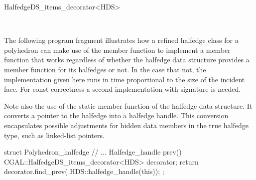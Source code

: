 \begin{ccRefClass}{HalfedgeDS_items_decorator<HDS>}
\ccSeeAlso

\\

\ccExample

The following program fragment illustrates how a refined halfedge
class for a polyhedron can make use of the  member
function to implement a  member function that works
regardless of whether the halfedge data structure  provides a
 member function for its halfedges or not. In the case that not,
the implementation given here runs in time proportional to the size of the 
incident face. For const-correctness a second implementation with signature
 is needed.

Note also the use of the static member function 
of the halfedge data structure. It converts a pointer to the halfedge
into a halfedge handle. This conversion encapsulates possible
adjustments for hidden data members in the true halfedge type, such as
linked-list pointers.

\begin{ccExampleCode}
struct Polyhedron_halfedge {
    // ...
    Halfedge_handle  prev() {
        CGAL::HalfedgeDS_items_decorator<HDS> decorator;
        return decorator.find_prev( HDS::halfedge_handle(this));
    }
};
\end{ccExampleCode}


\end{ccRefClass}

\ccRefPageEnd

